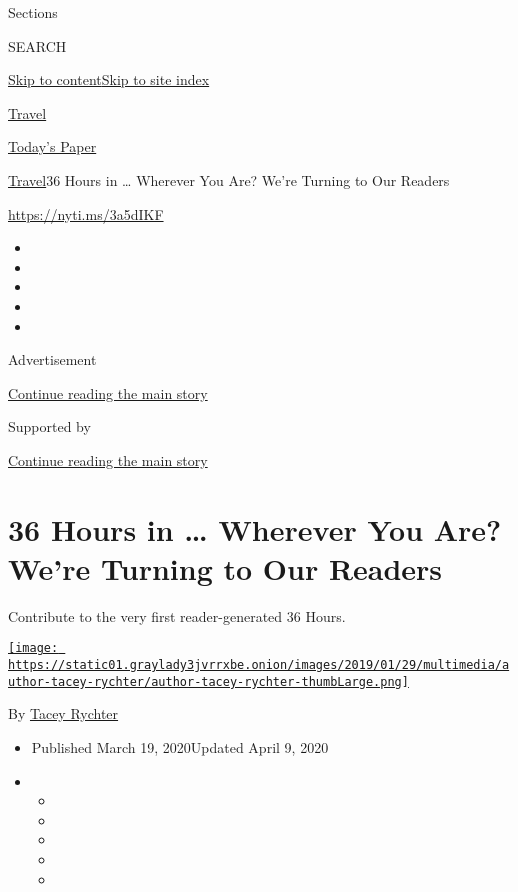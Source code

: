 Sections

SEARCH

\protect\hyperlink{site-content}{Skip to
content}\protect\hyperlink{site-index}{Skip to site index}

\href{https://www.nytimes3xbfgragh.onion/section/travel}{Travel}

\href{https://myaccount.nytimes3xbfgragh.onion/auth/login?response_type=cookie\&client_id=vi}{}

\href{https://www.nytimes3xbfgragh.onion/section/todayspaper}{Today's
Paper}

\href{/section/travel}{Travel}\textbar{}36 Hours in \ldots{} Wherever
You Are? We're Turning to Our Readers

\url{https://nyti.ms/3a5dIKF}

\begin{itemize}
\item
\item
\item
\item
\item
\end{itemize}

Advertisement

\protect\hyperlink{after-top}{Continue reading the main story}

Supported by

\protect\hyperlink{after-sponsor}{Continue reading the main story}

\hypertarget{36-hours-in--wherever-you-are-were-turning-to-our-readers}{%
\section{36 Hours in \ldots{} Wherever You Are? We're Turning to Our
Readers}\label{36-hours-in--wherever-you-are-were-turning-to-our-readers}}

Contribute to the very first reader-generated 36 Hours.

\href{https://www.nytimes3xbfgragh.onion/by/tacey-rychter}{\texttt{[image: https://static01.graylady3jvrrxbe.onion/images/2019/01/29/multimedia/author-tacey-rychter/author-tacey-rychter-thumbLarge.png]}}

By \href{https://www.nytimes3xbfgragh.onion/by/tacey-rychter}{Tacey
Rychter}

\begin{itemize}
\item
  Published March 19, 2020Updated April 9, 2020
\item
  \begin{itemize}
  \item
  \item
  \item
  \item
  \item
  \end{itemize}
\end{itemize}

